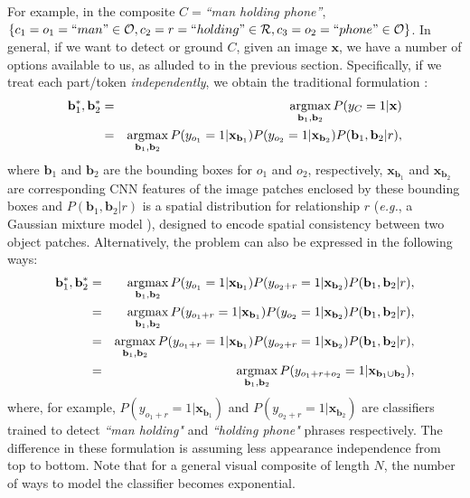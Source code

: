 \documentclass[runningheads]{llncs}
\makeatletter
\newcommand{\RevComment} [1]{{\color{Red}{#1}}}
\newcommand*{\eg}{{\em e.g.}\@\xspace}
\makeatother
\begin{document}
For example, in the composite $C=${\em ``man holding phone''},  $\{c_1 = o_1 =``man" \in \mathcal{O}, c_2 = r = ``holding" \in \mathcal{R}, c_3 = o_2 = ``phone" \in \mathcal{O} \}$. In general, if we want to detect or ground $C$, given an image $\mathbf{x}$, we have a number of options available to us, as alluded to in the previous section. Specifically, if we treat each part/token {\em independently}, we obtain the traditional formulation \cite{Johnson2015}:
%
\begin{eqnarray}
\mathbf{b}^{*}_{1},\mathbf{b}^{*}_{2} & = & \operatornamewithlimits{argmax}_{\mathbf{b}_1,\mathbf{b}_2} P(y_{C}=1 | \mathbf x) \nonumber \\
& = & 
\operatornamewithlimits{argmax}_{\mathbf{b}_1,\mathbf{b}_2} P(y_{o_1}=1|\mathbf x_{\mathbf{b}_1})P(y_{o_2}=1|\mathbf x_{\mathbf{b}_2})P(\mathbf{b}_1,\mathbf{b}_2|r),
\label{eq:indep}
\end{eqnarray}
%
\noindent
where $\mathbf{b}_1$ and $\mathbf{b}_2$ are the bounding boxes for $o_1$ and $o_2$, respectively,
$\mathbf{x}_{\mathbf{b}_1}$ and $\mathbf{x}_{\mathbf{b}_2}$ are corresponding CNN features of the image patches enclosed by these bounding boxes and $P(\mathbf{b}_1, \mathbf{b}_2|r)$ is a spatial distribution for relationship $r$ (\eg, a Gaussian mixture model \cite{Johnson2015}), designed to encode spatial consistency between two object patches. Alternatively, the problem can also be expressed in the following ways:
%
\begin{eqnarray}
\mathbf{b}^{*}_{1},\mathbf{b}^{*}_{2} 
& = & 
\operatornamewithlimits{argmax}_{\mathbf{b}_1,\mathbf{b}_2} P(y_{o_1}=1|\mathbf x_{\mathbf{b}_1})P(y_{o_2+r}=1|\mathbf x_{\mathbf{b}_2})P(\mathbf{b}_1,\mathbf{b}_2|r), \label{eq:joint_o2r} \\
& = & 
\operatornamewithlimits{argmax}_{\mathbf{b}_1,\mathbf{b}_2} P(y_{o_1+r}=1|\mathbf x_{\mathbf{b}_1})P(y_{o_2}=1|\mathbf x_{\mathbf{b}_2})P(\mathbf{b}_1,\mathbf{b}_2|r), \label{eq:joint_o1r}\\
& = & 
\operatornamewithlimits{argmax}_{\mathbf{b}_1,\mathbf{b}_2} P(y_{o_1+r}=1|\mathbf x_{\mathbf{b}_1})P(y_{o_2+r}=1|\mathbf x_{\mathbf{b}_2})P(\mathbf{b}_1,\mathbf{b}_2|r), \label{eq:joint_o1o2r}\\
& = & 
\operatornamewithlimits{argmax}_{\mathbf{b}_1,\mathbf{b}_2} P(y_{o_1+r+o_2}=1|\mathbf x_{\mathbf{b}_1 \cup \mathbf{b}_2}), \label{eq:full_joint}
\end{eqnarray}
%
where, for example, $P(y_{o_1+r}=1|\mathbf x_{\mathbf{b}_1})$ and $P(y_{o_2+r}=1|\mathbf x_{\mathbf{b}_2})$ are classifiers trained to detect {\em ``man holding"} and {\em ``holding phone"} phrases respectively. The difference in these formulation is assuming less appearance independence from top to bottom. Note that for a general visual composite of length $N$, the number of ways to model the classifier becomes exponential.
\end{document}
